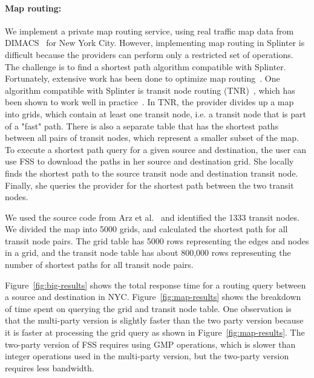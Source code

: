 \paragraph{Map routing:}
We implement a private map routing service, using real traffic map data from DIMACS~\cite{dimacs} for New York City.
However, implementing map routing in Splinter is difficult because the providers can
perform only a restricted set of operations. The challenge is to find a shortest path 
algorithm compatible with Splinter. Fortunately,
extensive work has been done to optimize map routing~\cite{bast2015route}.
One algorithm compatible with Splinter is transit node routing 
(TNR)~\cite{tnr, bast2007fast}, which has been
shown to work well in practice~\cite{bast2009ultrafast}. 
In TNR, the provider divides up a map into grids, 
which contain at least one transit node, i.e. a transit node 
that is part of a "fast" path. There is also a separate table
that has the shortest paths between all pairs of transit nodes, which 
represent a smaller subset of the map. To execute a shortest path query for a given
source and destination, the user can use FSS to download the paths
in her source and destination grid. She locally finds the shortest path to the source transit node
and destination transit node. Finally, she queries the provider for the shortest path
between the two transit nodes.

We used the source code from Arz et al.~\cite{tnr} and identified the 1333 transit nodes. We divided the map into 5000 grids,
and calculated the shortest path for all transit node pairs. The grid table has 5000 rows
representing the edges and nodes in a grid, and the transit node table has about 800,000
rows representing the number of shortest paths for all transit node pairs. 

Figure~\ref{fig:big-results} shows the total response time for a routing query
between a source and destination in NYC. Figure~\ref{fig:map-results} shows
the breakdown of time spent on querying the grid and transit node table.
One observation is that the multi-party version is slightly faster than the two party
version because it is faster at processing the grid query as shown in Figure~\ref{fig:map-results}.
The two-party version of FSS requires using GMP operations, which is slower than integer operations
used in the multi-party version, but the two-party version requires less bandwidth.

